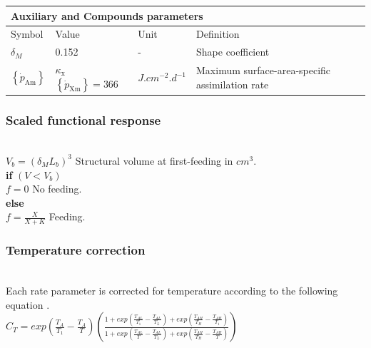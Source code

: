 \begin{table}[H]
\centering
\begin{adjustbox}{width=1.2\textwidth}
\begin{tabular}{l|l|l|l}
\hline
\multicolumn{4}{l}{Auxiliary and Compounds parameters}   \\
\hline
Symbol & Value & Unit & Definition                   \\
$\delta_{M}$
	& 0.152
	& -
	& Shape coefficient                               \\
$\left \{ \dot{p}_\mathrm{Am} \right \}$
	& $\kappa_{\mathrm{x}} $ $\left \{ \dot{p}_\mathrm{Xm} \right \}=366$
	& $J.cm^{-2}.d^{-1}$
	& Maximum surface-area-specific assimilation rate\\
\hline
\end{tabular}
\end{adjustbox}
\end{table}

\subsubsection{Scaled functional response}\label{Chap3resp_f}
\hfill \\

$V_{b} = (\delta_{M}L_{b})^3$ \hfill Structural volume at first-feeding in $cm^3$.\\

\textbf{if} $(V < V_{b})$ \\

$f = 0$ \hfill No feeding.\\

\textbf{else}\\

$f= \frac{X}{X+K}$	    \hfill Feeding.\\

\subsubsection{Temperature correction}\label{Chap3cT_corr}
\hfill \\

Each rate parameter is corrected for temperature according to the following equation \citep{Kooi2009}.\\

$
	C_{T} = exp\left ( \frac{T_{A}}{T_{1}} - \frac{T_{A}}{T} \right )
	\left ( \frac
				{1+exp\left ( \frac{T_{AL}}{T_{1}} - \frac{T_{AL}}{T_{L}} \right )
				  +exp\left ( \frac{T_{AH}}{T_{H}} - \frac{T_{AH}}{T_{1}} \right )}
				{1+exp\left ( \frac{T_{AL}}{T} - \frac{T_{AL}}{T_{L}} \right )
				  +exp\left ( \frac{T_{AH}}{T_{H}} - \frac{T_{AH}}{T} \right )}
	\right )
$\\

